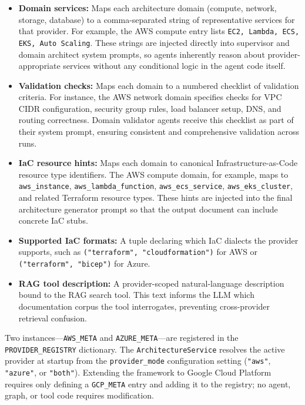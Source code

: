 \begin{itemize}
    \item \textbf{Domain services:} Maps each architecture domain (compute, network, storage, database) to a comma-separated string of representative services for that provider. For example, the AWS compute entry lists \texttt{EC2, Lambda, ECS, EKS, Auto Scaling}. These strings are injected directly into supervisor and domain architect system prompts, so agents inherently reason about provider-appropriate services without any conditional logic in the agent code itself.
    \item \textbf{Validation checks:} Maps each domain to a numbered checklist of validation criteria. For instance, the AWS network domain specifies checks for VPC CIDR configuration, security group rules, load balancer setup, DNS, and routing correctness. Domain validator agents receive this checklist as part of their system prompt, ensuring consistent and comprehensive validation across runs.
    \item \textbf{IaC resource hints:} Maps each domain to canonical Infrastructure-as-Code resource type identifiers. The AWS compute domain, for example, maps to \texttt{aws\_instance}, \texttt{aws\_lambda\_function}, \texttt{aws\_ecs\_service}, \texttt{aws\_eks\_cluster}, and related Terraform resource types. These hints are injected into the final architecture generator prompt so that the output document can include concrete IaC stubs.
    \item \textbf{Supported IaC formats:} A tuple declaring which IaC dialects the provider supports, such as \texttt{("terraform", "cloudformation")} for AWS or \texttt{("terraform", "bicep")} for Azure.
    \item \textbf{RAG tool description:} A provider-scoped natural-language description bound to the RAG search tool. This text informs the LLM which documentation corpus the tool interrogates, preventing cross-provider retrieval confusion.
\end{itemize}

Two instances---\texttt{AWS\_META} and \texttt{AZURE\_META}---are registered in the \texttt{PROVIDER\_REGISTRY} dictionary. The \texttt{ArchitectureService} resolves the active provider at startup from the \texttt{provider\_mode} configuration setting (\texttt{"aws"}, \texttt{"azure"}, or \texttt{"both"}). Extending the framework to Google Cloud Platform requires only defining a \texttt{GCP\_META} entry and adding it to the registry; no agent, graph, or tool code requires modification.

